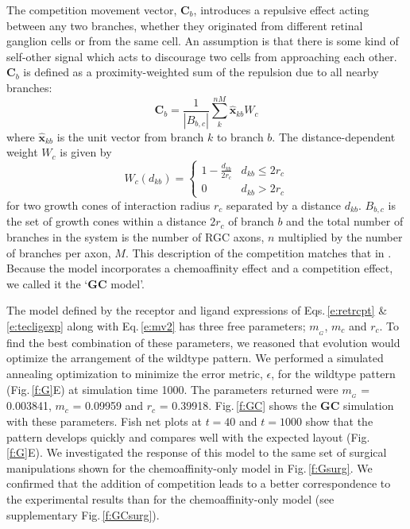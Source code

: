 \documentclass[11pt, a4paper]{article}
\begin{document}
%
The competition movement vector, $\mathbf{C}_b$, introduces a repulsive effect
acting between any two branches, whether they originated from different
retinal ganglion cells or from the same cell. An assumption is that there is
some kind of self-other signal which acts to discourage two cells from
approaching each other. $\mathbf{C}_b$ is defined as a proximity-weighted sum
of the repulsion due to all nearby branches:
%
\begin{equation} \label{e:C}
\mathbf{C}_b = \frac{1}{|B_{b,c}|} \sum_k^{nM} \hat{\mathbf{x}}_{kb} W_c
\end{equation}
where $\hat{\mathbf{x}}_{kb}$ is the unit vector from branch $k$ to branch
$b$. The distance-dependent weight $W_c$ is given by
\begin{equation}
W_c(d_{kb}) = \begin{cases}
      1 - \frac{d_{kb}}{2r_c}   & d_{kb} \leq 2r_c \\
     0 & d_{kb} > 2r_c
     \end{cases}
\end{equation}
for two growth cones of interaction radius $r_c$ separated by a distance
$d_{kb}$. $B_{b,c}$ is the set of growth cones within a distance $2r_c$ of
branch $b$ and the total number of branches in the system is the number of RGC
axons, $n$ multiplied by the number of branches per axon, $M$. This
description of the competition matches that
in \citet{simpson_simple_2011}. Because the model incorporates a chemoaffinity
effect and a competition effect, we called it the `$\mathbf{GC}$ model'.

The model defined by the receptor and ligand expressions of Eqs.\,\ref{e:retrcpt}
\& \ref{e:tecligexp} along with Eq.\,\ref{e:mv2} has three
free parameters; $m_{\!_G}$, $m_c$ and $r_c$. To find the best combination of
these parameters, we reasoned that evolution would optimize the arrangement of
the wildtype pattern. We performed a simulated annealing optimization to
minimize the error metric, $\epsilon$, for the wildtype pattern
(Fig.\,\ref{f:G}E) at simulation time 1000. The parameters returned were
$m_{\!_G}$ = 0.003841, $m_c$ = 0.09959 and $r_c$ = 0.39918. Fig.\,\ref{f:GC}
shows the $\mathbf{GC}$ simulation with these parameters. Fish net plots at
$t=40$ and $t=1000$ show that the pattern develops quickly and compares well
with the expected layout (Fig.\,\ref{f:G}E). We investigated the response of
this model to the same set of surgical manipulations shown for the
chemoaffinity-only model in Fig.\,\ref{f:Gsurg}. We confirmed that the
addition of competition leads to a better correspondence to the experimental
results than for the chemoaffinity-only model (see supplementary
Fig.\,\ref{f:GCsurg}).
\end{document}
